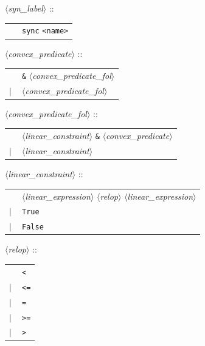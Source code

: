 \documentclass[a4paper,11pt]{report}
\newcommand{\nt}[1]{$\langle$\emph{#1}$\rangle$}
\newcommand{\regleGrammaire}[1]{\bigskip \noindent \nt{#1} :: \\}
\newcommand{\styleIMI}[1]{\textcolor{imicolor}{\texttt{#1}}}
\begin{document}
\regleGrammaire{syn\_label}
\begin{tabular}{l l}
	\  & \styleIMI{sync} \styleIMI{<name>} \\
\end{tabular}



\regleGrammaire{convex\_predicate}
\begin{tabular}{l l}
	\  & \styleIMI{\&} \nt{convex\_predicate\_fol} \\
	$|$ & \nt{convex\_predicate\_fol} \\
\end{tabular}

\regleGrammaire{convex\_predicate\_fol}
\begin{tabular}{l l}
	\  & \nt{linear\_constraint} \styleIMI{\&} \nt{convex\_predicate} \\
	$|$ & \nt{linear\_constraint} \\
\end{tabular}

\regleGrammaire{linear\_constraint}
\begin{tabular}{l l}
	\  & \nt{linear\_expression} \nt{relop} \nt{linear\_expression} \\
	$|$ & \styleIMI{True} \\
	$|$ & \styleIMI{False} \\
\end{tabular}

\regleGrammaire{relop}
\begin{tabular}{l l}
	\  & \styleIMI{<} \\
	$|$ & \styleIMI{<=} \\
	$|$ & \styleIMI{=} \\
	$|$ & \styleIMI{>=} \\
	$|$ & \styleIMI{>} \\
\end{tabular}
\end{document}
